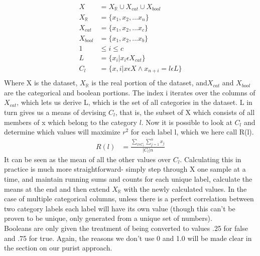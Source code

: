 \begin{align*}
X &= {X_\mathbb{R} \cup X_{cat} \cup X_{bool}}\\
X_\mathbb{R} &= \{x_1, x_2, ... x_n\}\\
X_{cat} &= \{x_1, x_2, ... x_c\}\\%
X_{bool} &= \{x_1, x_2, ... x_b\} \\
1&\leq i \leq c\\
L &= \{x_i|x_i\epsilon X_{cat}\}\\%
C_l &= \{x, i|  x\epsilon X \wedge x_{n+i} = l\epsilon L \}\\%
\end{align*}
Where X is the dataset, $X_\mathbb{R}$ is the real portion of the dataset, and$ X_{cat}$ and $X_{bool}$ are the categorical and boolean portions.  The index i iterates over the columns of $X_{cat}$, which lets us derive L, which is the set of all categories in the dataset.  L in turn gives us a means of devising $C_l$, that is, the subset of X which consists of all members of x which belong to the category $l$. Now it is possible to look at $C_l$ and determine which values will maximize $r^2$ for each label l, which we here call R(l).
\begin{align}
R(l) &= \frac{\sum_{x\epsilon C_l}\sum_{j=1}^{n}x_j}{|C_l|n}
\end{align} 
It can be seen as the mean of all the other values over $C_l$.  Calculating this in practice is much more straightforward- simply step through X one sample at a time, and maintain running sums and counts for each unique label, calculate the means at the end and then extend $X_\mathbb{R}$ with the newly calculated values.  In the case of multiple categorical columns, unless there is a perfect correlation between two category labels each label will have its own value (though this can't be proven to be unique, only generated from a unique set of numbers).\\
Booleans are only given the treatment of being converted to values .25 for false and .75 for true.  Again, the reasons we don't use 0 and 1.0 will be made clear in the section on our purist approach.\\
